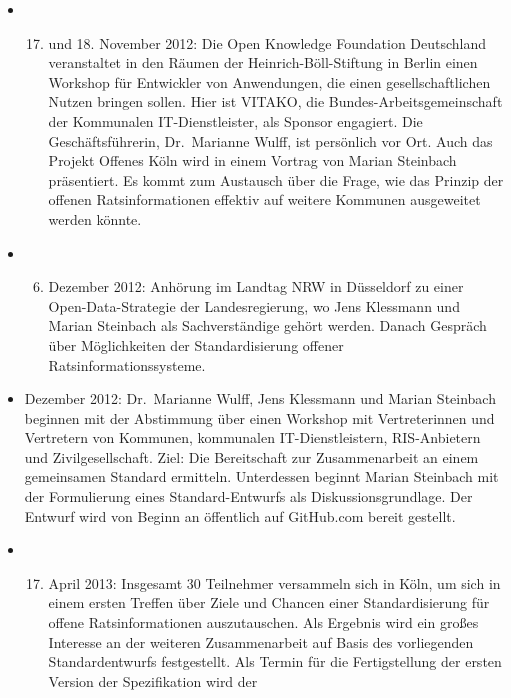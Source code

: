 \documentclass[,a4paper]{article}
\begin{document}
\begin{itemize}
\item
  \begin{enumerate}[1.]
  \setcounter{enumi}{16}
  \item
    und 18. November 2012: Die Open Knowledge Foundation Deutschland
    veranstaltet in den Räumen der Heinrich-Böll-Stiftung in Berlin
    einen Workshop für Entwickler von Anwendungen, die einen
    gesellschaftlichen Nutzen bringen sollen. Hier ist VITAKO, die
    Bundes-Arbeitsgemeinschaft der Kommunalen IT-Dienstleister, als
    Sponsor engagiert. Die Geschäftsführerin, Dr.~Marianne Wulff, ist
    persönlich vor Ort. Auch das Projekt Offenes Köln wird in einem
    Vortrag von Marian Steinbach präsentiert. Es kommt zum Austausch
    über die Frage, wie das Prinzip der offenen Ratsinformationen
    effektiv auf weitere Kommunen ausgeweitet werden könnte.
  \end{enumerate}
\item
  \begin{enumerate}[1.]
  \setcounter{enumi}{5}
  \item
    Dezember 2012: Anhörung im Landtag NRW in Düsseldorf zu einer
    Open-Data-Strategie der Landesregierung, wo Jens Klessmann und
    Marian Steinbach als Sachverständige gehört werden. Danach Gespräch
    über Möglichkeiten der Standardisierung offener
    Ratsinformationssysteme.
  \end{enumerate}
\item
  Dezember 2012: Dr.~Marianne Wulff, Jens Klessmann und Marian Steinbach
  beginnen mit der Abstimmung über einen Workshop mit Vertreterinnen und
  Vertretern von Kommunen, kommunalen IT-Dienstleistern, RIS-Anbietern
  und Zivilgesellschaft. Ziel: Die Bereitschaft zur Zusammenarbeit an
  einem gemeinsamen Standard ermitteln. Unterdessen beginnt Marian
  Steinbach mit der Formulierung eines Standard-Entwurfs als
  Diskussionsgrundlage. Der Entwurf wird von Beginn an öffentlich auf
  GitHub.com bereit gestellt.
\item
  \begin{enumerate}[1.]
  \setcounter{enumi}{16}
  \item
    April 2013: Insgesamt 30 Teilnehmer versammeln sich in Köln, um sich
    in einem ersten Treffen über Ziele und Chancen einer
    Standardisierung für offene Ratsinformationen auszutauschen. Als
    Ergebnis wird ein großes Interesse an der weiteren Zusammenarbeit
    auf Basis des vorliegenden Standardentwurfs festgestellt. Als Termin
    für die Fertigstellung der ersten Version der Spezifikation wird der

\end{enumerate}
\end{itemize}
\end{document}
